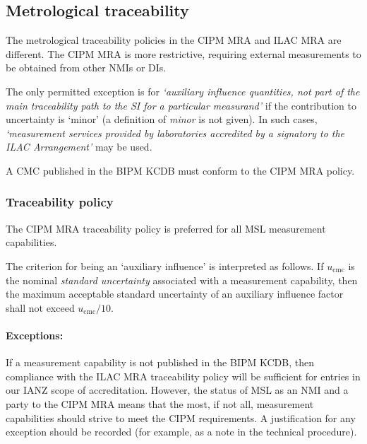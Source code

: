 \subsection{Metrological traceability}
 \label{ss:metrological_traceability}
The metrological traceability policies in the CIPM MRA \cite{CIPM_MRA_POLICY} and ILAC MRA \cite{ILAC_MRA_POLICY} are different. The CIPM MRA is more restrictive, requiring external measurements to be obtained from other NMIs or DIs. 

The only permitted exception is for \textit{`auxiliary influence quantities, not part of the main traceability path to the SI for a particular measurand'} if the contribution to uncertainty is `minor' (a definition of \textit{minor} is not given). In such cases, \textit{`measurement services provided by laboratories accredited by a signatory to the ILAC Arrangement'} may be used.

A CMC published in the BIPM KCDB must conform to the CIPM MRA policy.

\subsubsection{Traceability policy}
 \label{sss:traceability_policy}
The CIPM MRA traceability policy is preferred for all MSL measurement capabilities.

The criterion for being an `auxiliary influence' is interpreted as follows. If $u_\mathrm{cmc}$ is the nominal \textit{standard uncertainty} associated with a measurement capability, then the maximum acceptable standard uncertainty of an auxiliary influence factor shall not exceed $u_\mathrm{cmc} / 10$. 

\paragraph{Exceptions:} 
If a measurement capability is not published in the BIPM KCDB, then compliance with the ILAC MRA traceability policy will be sufficient for entries in our IANZ scope of accreditation. However, the status of MSL as an NMI and a party to the CIPM MRA means that the most, if not all, measurement capabilities should strive to meet the CIPM requirements. A justification for any exception should be recorded (for example, as a note in the technical procedure).


%
% 
% 
%
%

